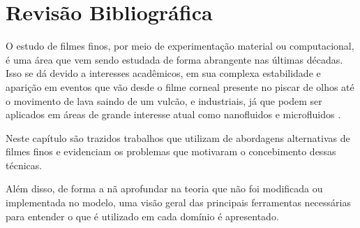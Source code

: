 \chapter{Revisão Bibliográfica}

O estudo de filmes finos, por meio de experimentação material ou computacional, é uma área que vem sendo estudada de forma abrangente nas últimas décadas. Isso se dá devido a interesses acadêmicos, em sua complexa estabilidade e aparição em eventos que vão desde o filme corneal presente no piscar de olhos até o movimento de lava saindo de um vulcão, e industriais, já que podem ser aplicados em áreas de grande interesse atual como nanofluidos e microfluidos \citep{Craster2009}.


Neste capítulo são trazidos trabalhos que utilizam de abordagens alternativas de filmes finos e evidenciam os problemas que motivaram o concebimento dessas técnicas.

Além disso, de forma a nã aprofundar na teoria que não foi modificada ou implementada no modelo, uma visão geral das principais ferramentas necessárias para entender o que é utilizado em cada domínio é apresentado. 








% 
